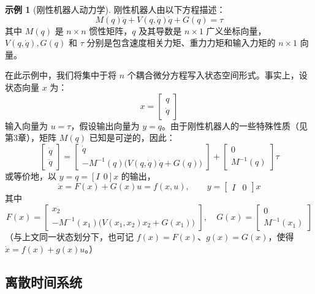 \documentclass[UTF8,12pt,a4paper]{ctexart}
\theoremstyle{definition}
\newtheorem{example}{示例}[section]
\begin{document}
\begin{example}[刚性机器人动力学]
刚性机器人由以下方程描述：
\[
M(q)\ddot{q} + V(q, \dot{q})\dot{q} + G(q) = \tau
\]
其中 $M(q)$ 是 $n \times n$ 惯性矩阵，$q$ 及其导数是 $n \times 1$ 广义坐标向量，$V(q, \dot{q}), G(q)$ 和 $\tau$ 分别是包含速度相关力矩、重力力矩和输入力矩的 $n \times 1$ 向量。

在此示例中，我们将集中于将 $n$ 个耦合微分方程写入状态空间形式。事实上，设状态向量 $x$ 为：
\[
x = \begin{bmatrix} q \\ \dot{q} \end{bmatrix}
\]
输入向量为 $u=\tau$，假设输出向量为 $y=q$。由于刚性机器人的一些特殊性质（见第3章），矩阵 $M(q)$ 已知是可逆的，因此：
\[
\begin{bmatrix} \dot{q} \\ \ddot{q} \end{bmatrix} = \begin{bmatrix} \dot{q} \\ -M^{-1}(q)\bigl(V(q,\dot{q})\dot{q} + G(q)\bigr) \end{bmatrix} + \begin{bmatrix} 0 \\ M^{-1}(q) \end{bmatrix} \tau
\]
或等价地，以 $y=q=[I \ \ 0]x$ 的输出，
\[
\dot{x} = F(x) + G(x)u = f(x,u), \qquad y = \begin{bmatrix} I & 0 \end{bmatrix} x
\]
其中
\[
F(x) = \begin{bmatrix} x_2 \\ -M^{-1}(x_1)\bigl(V(x_1,x_2)x_2 + G(x_1)\bigr) \end{bmatrix}, \quad G(x) = \begin{bmatrix} 0 \\ M^{-1}(x_1) \end{bmatrix}
\]
（与上文同一状态划分下，也可记 $f(x)=F(x)$、$g(x)=G(x)$，使得 $\dot{x}=f(x)+g(x)u$。）
\end{example}

\subsection{离散时间系统}
\end{document}
